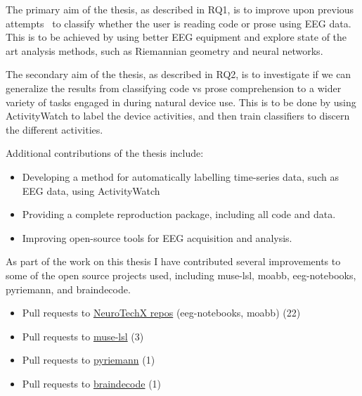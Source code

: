     The primary aim of the thesis, as described in RQ1, is to improve upon previous attempts~\cite{fucci_replication_2019} to classify whether the user is reading code or prose using EEG data. This is to be achieved by using better EEG equipment and explore state of the art analysis methods, such as Riemannian geometry and neural networks.

    The secondary aim of the thesis, as described in RQ2, is to investigate if we can generalize the results from classifying code vs prose comprehension to a wider variety of tasks engaged in during natural device use. This is to be done by using ActivityWatch to label the device activities, and then train classifiers to discern the different activities.

    Additional contributions of the thesis include:

    \begin{itemize}
        \item Developing a method for automatically labelling time-series data, such as EEG data, using ActivityWatch
        \item Providing a complete reproduction package, including all code and data.
        \item Improving open-source tools for EEG acquisition and analysis.
    \end{itemize}

    As part of the work on this thesis I have contributed several improvements to some of the open source projects used, including muse-lsl, moabb, eeg-notebooks, pyriemann, and braindecode.

    \begin{itemize}
        \item Pull requests to \href{%
                https://github.com/search?q=org%
            }{NeuroTechX repos} (eeg-notebooks, moabb) (22)
        \item Pull requests to \href{%
                https://github.com/search?q=org%
            }{muse-lsl} (3)
        \item Pull requests to \href{%
                https://github.com/search?q=org%
            }{pyriemann} (1)
        \item Pull requests to \href{%
                https://github.com/search?q=org%
            }{braindecode} (1)
    \end{itemize}

